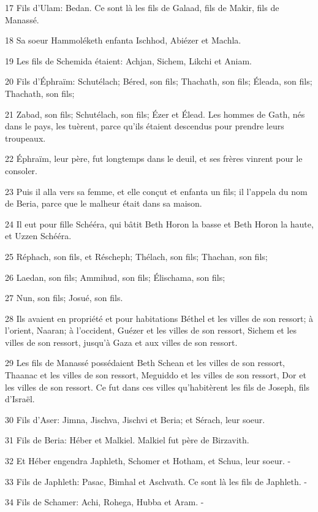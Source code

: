 \par 17 Fils d'Ulam: Bedan. Ce sont là les fils de Galaad, fils de Makir, fils de Manassé.
\par 18 Sa soeur Hammoléketh enfanta Ischhod, Abiézer et Machla.
\par 19 Les fils de Schemida étaient: Achjan, Sichem, Likchi et Aniam.
\par 20 Fils d'Éphraïm: Schutélach; Béred, son fils; Thachath, son fils; Éleada, son fils; Thachath, son fils;
\par 21 Zabad, son fils; Schutélach, son fils; Ézer et Élead. Les hommes de Gath, nés dans le pays, les tuèrent, parce qu'ils étaient descendus pour prendre leurs troupeaux.
\par 22 Éphraïm, leur père, fut longtemps dans le deuil, et ses frères vinrent pour le consoler.
\par 23 Puis il alla vers sa femme, et elle conçut et enfanta un fils; il l'appela du nom de Beria, parce que le malheur était dans sa maison.
\par 24 Il eut pour fille Schééra, qui bâtit Beth Horon la basse et Beth Horon la haute, et Uzzen Schééra.
\par 25 Réphach, son fils, et Réscheph; Thélach, son fils; Thachan, son fils;
\par 26 Laedan, son fils; Ammihud, son fils; Élischama, son fils;
\par 27 Nun, son fils; Josué, son fils.
\par 28 Ils avaient en propriété et pour habitations Béthel et les villes de son ressort; à l'orient, Naaran; à l'occident, Guézer et les villes de son ressort, Sichem et les villes de son ressort, jusqu'à Gaza et aux villes de son ressort.
\par 29 Les fils de Manassé possédaient Beth Schean et les villes de son ressort, Thaanac et les villes de son ressort, Meguiddo et les villes de son ressort, Dor et les villes de son ressort. Ce fut dans ces villes qu'habitèrent les fils de Joseph, fils d'Israël.
\par 30 Fils d'Aser: Jimna, Jischva, Jischvi et Beria; et Sérach, leur soeur.
\par 31 Fils de Beria: Héber et Malkiel. Malkiel fut père de Birzavith.
\par 32 Et Héber engendra Japhleth, Schomer et Hotham, et Schua, leur soeur. -
\par 33 Fils de Japhleth: Pasac, Bimhal et Aschvath. Ce sont là les fils de Japhleth. -
\par 34 Fils de Schamer: Achi, Rohega, Hubba et Aram. -
